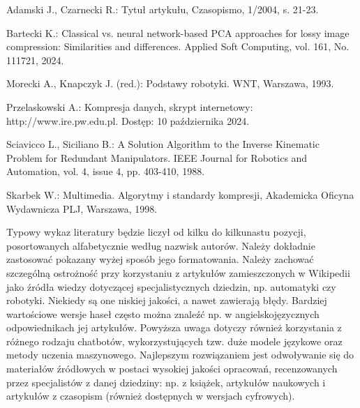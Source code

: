 \cleardoublepage
{}

Adamski J., Czarnecki R.: Tytuł artykułu, Czasopismo, 1/2004, s. 21-23.

Bartecki K.: Classical vs. neural network-based PCA approaches for lossy image compression: Similarities and differences. Applied Soft Computing, vol. 161, No. 111721, 2024.

Morecki A., Knapczyk J. (red.): Podstawy robotyki. WNT, Warszawa, 1993.

Przelaskowski A.: Kompresja danych, skrypt internetowy: http://www.ire.pw.edu.pl. Dostęp: 10 października 2024.

Sciavicco L., Siciliano B.: A Solution Algorithm to the Inverse Kinematic Problem for Redundant Manipulators. IEEE Journal for Robotics and Automation, vol. 4, issue 4, pp. 403-410, 1988.

Skarbek W.: Multimedia. Algorytmy i standardy kompresji, Akademicka Oficyna Wydawnicza PLJ, Warszawa, 1998.

Typowy wykaz literatury będzie liczył od kilku do kilkunastu pozycji, posortowanych alfabetycznie według nazwisk autorów. Należy dokładnie zastosować pokazany wyżej sposób jego formatowania. Należy zachować szczególną ostrożność przy korzystaniu z artykułów zamieszczonych w Wikipedii jako źródła wiedzy dotyczącej specjalistycznych dziedzin, np. automatyki czy robotyki. Niekiedy są one niskiej jakości, a nawet zawierają błędy. Bardziej wartościowe wersje haseł często można znaleźć np. w angielskojęzycznych odpowiednikach jej artykułów. Powyższa uwaga dotyczy również korzystania z różnego rodzaju chatbotów, wykorzystujących tzw. duże modele językowe oraz metody uczenia maszynowego. Najlepszym rozwiązaniem jest odwoływanie się do materiałów źródłowych w postaci wysokiej jakości opracowań, recenzowanych przez specjalistów z danej dziedziny: np. z książek, artykułów naukowych i artykułów z czasopism (również dostępnych w wersjach cyfrowych).

% 
% 

\printbibliography